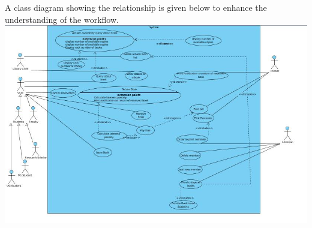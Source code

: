 \documentclass{article}
\begin{document}
A class diagram showing the relationship is given below to enhance the understanding of the workflow.\\

\includegraphics[scale=0.60]{images/useCaseDiag.jpg}
\end{document}
